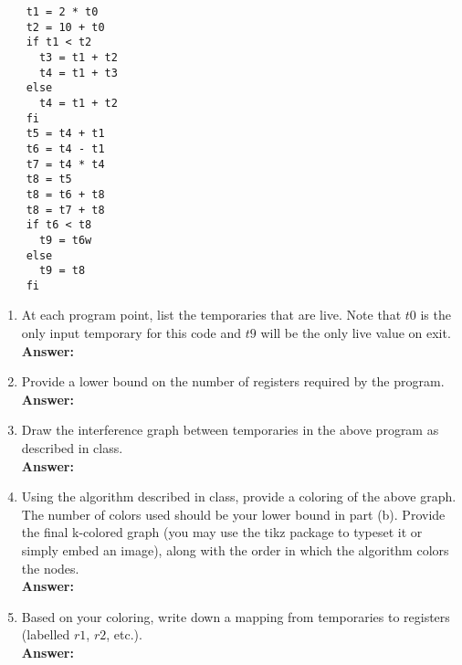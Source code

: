 \documentclass[11pt]{article}
\begin{document}
\begin{enumerate}
  \begin{lstlisting}
    t1 = 2 * t0
    t2 = 10 + t0
    if t1 < t2
      t3 = t1 + t2
      t4 = t1 + t3
    else
      t4 = t1 + t2
    fi
    t5 = t4 + t1
    t6 = t4 - t1
    t7 = t4 * t4
    t8 = t5
    t8 = t6 + t8
    t8 = t7 + t8
    if t6 < t8
      t9 = t6w
    else
      t9 = t8
    fi
  \end{lstlisting}
  \begin{enumerate}
    \item At each program point, list the temporaries that are live. Note that $t0$ is the only input temporary for this code and $t9$ will be the only live value on exit.\\
    \textbf{Answer:} 
    
   \newpage
    \item Provide a lower bound on the number of registers required by the program.\\
    \textbf{Answer:} 
    
   \newpage
    \item Draw the interference graph between temporaries in the above program as described in class.\\
    \textbf{Answer:} 
    
   \newpage
    \item Using the algorithm described in class, provide a coloring of the above graph. The number of colors used should be your lower bound in part (b). Provide the final k-colored graph (you may use the tikz package to typeset it or simply embed an image), along with the order in which the algorithm colors the nodes.\\
    \textbf{Answer:} 
    
   \newpage
    \item Based on your coloring, write down a mapping from temporaries to registers (labelled $r1$, $r2$, etc.).\\
    \textbf{Answer:} 
    
   \newpage
  \end{enumerate}
  
\end{enumerate}
\end{document}

